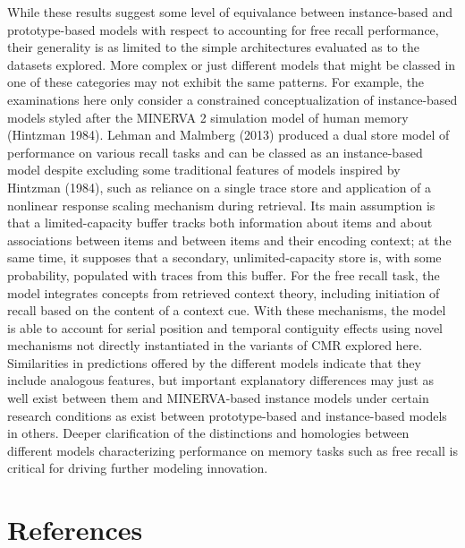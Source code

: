 \documentclass[
  letterpaper,
  DIV=11]{article}
\begin{document}
While these results suggest some level of equivalance between
instance-based and prototype-based models with respect to accounting for
free recall performance, their generality is as limited to the simple
architectures evaluated as to the datasets explored. More complex or
just different models that might be classed in one of these categories
may not exhibit the same patterns. For example, the examinations here
only consider a constrained conceptualization of instance-based models
styled after the MINERVA 2 simulation model of human memory (Hintzman
1984). Lehman and Malmberg (2013) produced a dual store model of
performance on various recall tasks and can be classed as an
instance-based model despite excluding some traditional features of
models inspired by Hintzman (1984), such as reliance on a single trace
store and application of a nonlinear response scaling mechanism during
retrieval. Its main assumption is that a limited-capacity buffer tracks
both information about items and about associations between items and
between items and their encoding context; at the same time, it supposes
that a secondary, unlimited-capacity store is, with some probability,
populated with traces from this buffer. For the free recall task, the
model integrates concepts from retrieved context theory, including
initiation of recall based on the content of a context cue. With these
mechanisms, the model is able to account for serial position and
temporal contiguity effects using novel mechanisms not directly
instantiated in the variants of CMR explored here. Similarities in
predictions offered by the different models indicate that they include
analogous features, but important explanatory differences may just as
well exist between them and MINERVA-based instance models under certain
research conditions as exist between prototype-based and instance-based
models in others. Deeper clarification of the distinctions and
homologies between different models characterizing performance on memory
tasks such as free recall is critical for driving further modeling
innovation.

\hypertarget{references}{%
\section{References}\label{references}}
\end{document}
